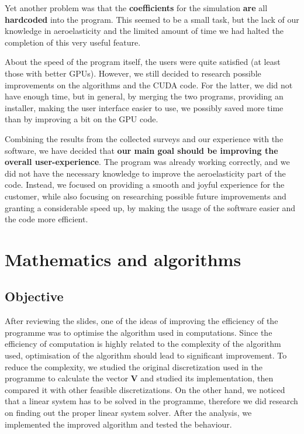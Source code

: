 \documentclass[a4paper, 11pt, article]{report}
\begin{document}
Yet another problem was that the \textbf{coefficients} for the simulation \textbf{are} all \textbf{hardcoded} into the program. This seemed to be a small task, but the lack of our knowledge in aeroelasticity and the limited amount of time we had halted the completion of this very useful feature.

About the speed of the program itself, the users were quite satisfied (at least those with better GPUs). However, we still decided to research possible improvements on the algorithms and the CUDA code. For the latter, we did not have enough time, but in general, by merging the two programs, providing an installer, making the user interface easier to use, we possibly saved more time than by improving a bit on the GPU code.

Combining the results from the collected surveys and our experience with the software, we have decided that \textbf{our main goal should be improving the overall user-experience}. The program was already working correctly, and we did not have the necessary knowledge to improve the aeroelasticity part of the code. Instead, we focused on providing a smooth and joyful experience for the customer, while also focusing on researching possible future improvements and granting a considerable speed up, by making the usage of the software easier and the code more efficient.

\section{Mathematics and algorithms}

\subsection{Objective}

After reviewing the slides, one of the ideas of improving the efficiency of the programme was to optimise the algorithm used in computations. Since the efficiency of computation is highly related to the complexity of the algorithm used, optimisation of the algorithm should lead to significant improvement. To reduce the complexity, we studied the original discretization used in the programme to calculate the vector \textbf{V} and studied its implementation, then compared it with other feasible discretizations. On the other hand, we noticed that a linear system has to be solved in the programme, therefore we did research on finding out the proper linear system solver. After the analysis, we implemented the improved algorithm and tested the behaviour.
\end{document}
